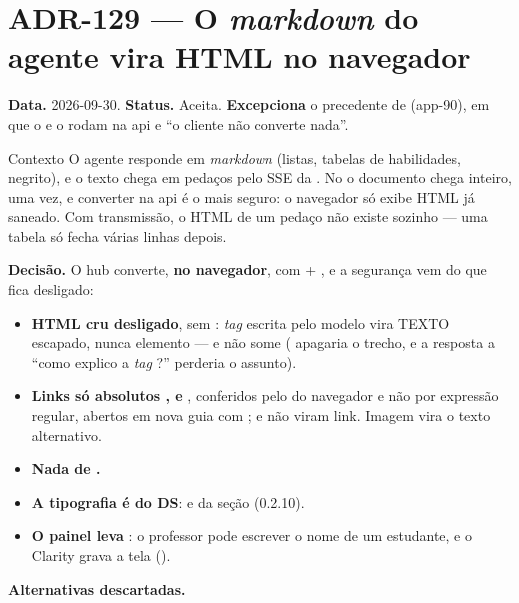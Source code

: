 \section{ADR-129 --- O \emph{markdown} do agente vira HTML no navegador}
\label{adr:agente-professor-markdown}

\textbf{Data.} 2026-09-30. \textbf{Status.} Aceita. \textbf{Excepciona} o
precedente de  (app-90), em que o  e o
 rodam na api e \enquote{o cliente não converte nada}.

\begin{especificacao}{Contexto}
O agente responde em \emph{markdown} (listas, tabelas de habilidades, negrito), e
o texto chega em pedaços pelo SSE da . No  o documento
chega inteiro, uma vez, e converter na api é o mais seguro: o navegador só exibe
HTML já saneado. Com transmissão, o HTML de um pedaço não existe sozinho --- uma
tabela só fecha várias linhas depois.
\end{especificacao}

\textbf{Decisão.} O hub converte, \textbf{no navegador}, com
 + , e a segurança vem do que fica desligado:

\begin{itemize}
  \item \textbf{HTML cru desligado}, sem : \emph{tag} escrita pelo
    modelo vira TEXTO escapado, nunca elemento --- e não some (
    apagaria o trecho, e a resposta a \enquote{como explico a \emph{tag}
    ?} perderia o assunto).
  \item \textbf{Links só absolutos ,  e },
    conferidos pelo  do navegador e não por expressão regular, abertos em
    nova guia com ;  e 
    não viram link. Imagem vira o texto alternativo.
  \item \textbf{Nada de .}
  \item \textbf{A tipografia é do DS}:  e 
    da seção  (0.2.10).
  \item \textbf{O painel leva }: o professor pode escrever
    o nome de um estudante, e o Clarity grava a tela ().
\end{itemize}

\textbf{Alternativas descartadas.}

